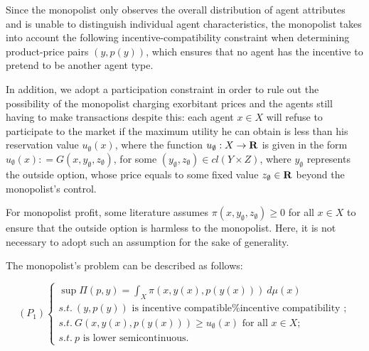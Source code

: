 
Since the monopolist only observes the overall distribution of agent attributes and is unable to distinguish individual agent characteristics, the monopolist takes into account the following incentive-compatibility constraint when determining product-price pairs $(y, p(y))$, which ensures that no agent has the incentive to pretend to be another agent type.\medskip 


In addition, we adopt a participation constraint in order to rule out the possibility of the monopolist charging exorbitant prices and the agents still having to make transactions despite this: each agent $x\in X$ will refuse to participate to the market if the maximum utility he can obtain %
is less than his reservation value $u_{\emptyset}(x)$, where the function $u_{\emptyset}: X \rightarrow {\mathbf R}$ is given in the form $u_{\emptyset}(x): = G(x, y_{\emptyset}, z_{\emptyset})$, for some $(y_{\emptyset}, z_{\emptyset}) \in cl(Y \times Z)$, where $y_{\emptyset}$ represents the outside option, whose price equals to some fixed value $z_{\emptyset} \in {\mathbf R}$ beyond the monopolist's control.  \medskip

{For monopolist profit, some literature assumes $\pi(x, y_{\emptyset}, z_{\emptyset}) \ge  0$ for all $x\in X$ to ensure that the outside option is harmless to the monopolist. Here, it is not necessary to adopt such an assumption for the sake of generality. \medskip}


The monopolist's problem can be described as follows:


\begin{equation}\label{origin_problem}
(P_1)
\begin{cases}
\sup \Pi(p,y)=\int_{X} \pi(x, y(x), p(y(x)))~ d\mu(x)\\
s.t.\ (y,p(y)) \text{~is incentive compatible%
	};\\
s.t.\  G(x, y(x), p(y(x))) \ge u_{\emptyset}(x) \text{ for all } x \in X;\\
s.t.\ p \text{  is lower semicontinuous}.
\end{cases}
\end{equation}

